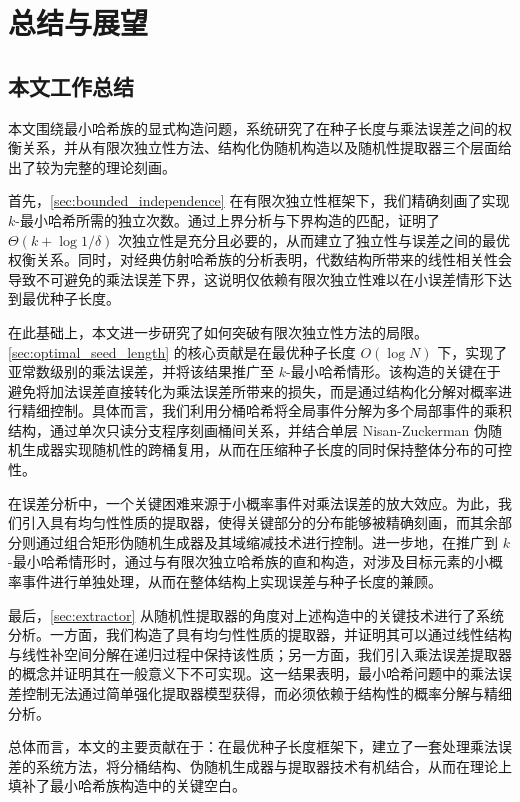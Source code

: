 \section{总结与展望}\label{sec:summary}

\subsection{本文工作总结}

本文围绕最小哈希族的显式构造问题，系统研究了在种子长度与乘法误差之间的权衡关系，并从有限次独立性方法、结构化伪随机构造以及随机性提取器三个层面给出了较为完整的理论刻画。

首先，\ref{sec:bounded_independence} 在有限次独立性框架下，我们精确刻画了实现 $k$-最小哈希所需的独立次数。通过上界分析与下界构造的匹配，证明了 $\Theta(k + \log 1/\delta)$ 次独立性是充分且必要的，从而建立了独立性与误差之间的最优权衡关系。同时，对经典仿射哈希族的分析表明，代数结构所带来的线性相关性会导致不可避免的乘法误差下界，这说明仅依赖有限次独立性难以在小误差情形下达到最优种子长度。

在此基础上，本文进一步研究了如何突破有限次独立性方法的局限。\ref{sec:optimal_seed_length} 的核心贡献是在最优种子长度 $O(\log N)$ 下，实现了亚常数级别的乘法误差，并将该结果推广至 $k$-最小哈希情形。该构造的关键在于避免将加法误差直接转化为乘法误差所带来的损失，而是通过结构化分解对概率进行精细控制。具体而言，我们利用分桶哈希将全局事件分解为多个局部事件的乘积结构，通过单次只读分支程序刻画桶间关系，并结合单层 Nisan-Zuckerman 伪随机生成器实现随机性的跨桶复用，从而在压缩种子长度的同时保持整体分布的可控性。

在误差分析中，一个关键困难来源于小概率事件对乘法误差的放大效应。为此，我们引入具有均匀性性质的提取器，使得关键部分的分布能够被精确刻画，而其余部分则通过组合矩形伪随机生成器及其域缩减技术进行控制。进一步地，在推广到 $k$-最小哈希情形时，通过与有限次独立哈希族的直和构造，对涉及目标元素的小概率事件进行单独处理，从而在整体结构上实现误差与种子长度的兼顾。

最后，\ref{sec:extractor} 从随机性提取器的角度对上述构造中的关键技术进行了系统分析。一方面，我们构造了具有均匀性性质的提取器，并证明其可以通过线性结构与线性补空间分解在递归过程中保持该性质；另一方面，我们引入乘法误差提取器的概念并证明其在一般意义下不可实现。这一结果表明，最小哈希问题中的乘法误差控制无法通过简单强化提取器模型获得，而必须依赖于结构性的概率分解与精细分析。

总体而言，本文的主要贡献在于：在最优种子长度框架下，建立了一套处理乘法误差的系统方法，将分桶结构、伪随机生成器与提取器技术有机结合，从而在理论上填补了最小哈希族构造中的关键空白。

